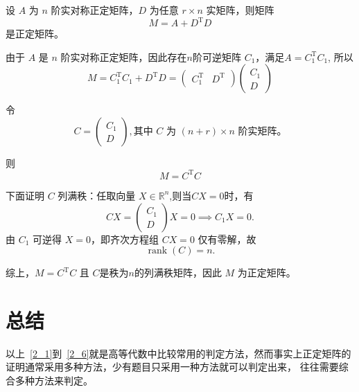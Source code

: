 \begin{example}
  设 $A$ 为 $n$ 阶实对称正定矩阵，$D$ 为任意 $r \times n$ 实矩阵，则矩阵\[M = A + D^\mathrm{T} D\]是正定矩阵。
\end{example}
\begin{solution}
  由于 $A$ 是 $n$ 阶实对称正定矩阵，因此存在$n$阶可逆矩阵 $C_1$，满足$A = C_1^\mathrm{T} C_1$,
  所以\[M=C_1^\mathrm{T} C_1 + D^\mathrm{T} D=
  \begin{pmatrix} C_1^\mathrm{T} & D^\mathrm{T} \end{pmatrix} \begin{pmatrix} C_1 \\ D \end{pmatrix}\]
  
  令\[C = \begin{pmatrix} C_1 \\ D \end{pmatrix},\text{其中 $C$ 为 $(n+r) \times n$ 阶实矩阵。}\]
  
  则\[M=C^\mathrm{T}C\]
  
  下面证明 $C$ 列满秩：任取向量 $X \in \mathbb{R}^n$,则当$CX=0$时，有
          \[
          CX=\begin{pmatrix} C_1 \\ D \end{pmatrix}X = 0 \implies C_1 X= 0.
          \]
          由 $C_1$ 可逆得 $X=0$，即齐次方程组 $CX=0$ 仅有零解，故
          \[
          \operatorname{rank}(C)=n.
          \]

    综上，$M = C^\mathrm{T} C$ 且 $C$是秩为$n$的列满秩矩阵，因此 $M$ 为正定矩阵。
\end{solution}
\section{总结}
以上~\ref{2_1}到~\ref{2_6}就是高等代数中比较常用的判定方法，然而事实上正定矩阵的证明通常采用多种方法，少有题目只采用一种方法就可以判定出来，
往往需要综合多种方法来判定。

